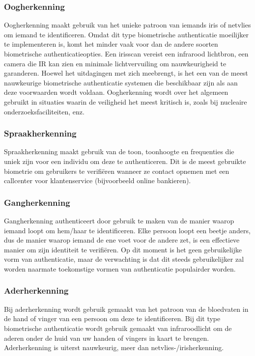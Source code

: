   \subsubsection{Oogherkenning}%
  \label{subsubsec:oogherkenning}
  Oogherkenning maakt gebruik van het unieke patroon van iemands iris of netvlies om iemand te identificeren. Omdat dit type biometrische authenticatie moeilijker te implementeren is, komt het minder vaak voor dan de andere soorten biometrische authenticatieopties. Een irisscan vereist een infrarood lichtbron, een camera die IR kan zien en minimale lichtvervuiling om nauwkeurigheid te garanderen. Hoewel het uitdagingen met zich meebrengt, is het een van de meest nauwkeurige biometrische authenticatie systemen die beschikbaar zijn als aan deze voorwaarden wordt voldaan. Oogherkenning wordt over het algemeen gebruikt in situaties waarin de veiligheid het meest kritisch is, zoals bij nucleaire onderzoeksfaciliteiten, enz.
  
  \subsubsection{Spraakherkenning}%
  \label{subsubsec:spraakherkenning}
  Spraakherkenning maakt gebruik van de toon, toonhoogte en frequenties die uniek zijn voor een individu om deze te authenticeren. Dit is de meest gebruikte biometrie om gebruikers te verifiëren wanneer ze contact opnemen met een callcenter voor klantenservice (bijvoorbeeld online bankieren).
  
  \subsubsection{Gangherkenning}%
  \label{subsubsec:gangherkenning}
  Gangherkenning authenticeert door gebruik te maken van de manier waarop iemand loopt om hem/haar te identificeren. Elke persoon loopt een beetje anders, dus de manier waarop iemand de ene voet voor de andere zet, is een effectieve manier om zijn identiteit te verifiëren. Op dit moment is het geen gebruikelijke vorm van authenticatie, maar de verwachting is dat dit steeds gebruikelijker zal worden naarmate toekomstige vormen van authenticatie populairder worden.
  
  \subsubsection{Aderherkenning}%
  \label{subsubsec:aderherkenning}
  Bij aderherkenning wordt gebruik gemaakt van het patroon van de bloedvaten in de hand of vinger van een persoon om deze te identificeren. Bij dit type biometrische authenticatie wordt gebruik gemaakt van infraroodlicht om de aderen onder de huid van uw handen of vingers in kaart te brengen. Aderherkenning is uiterst nauwkeurig, meer dan netvlies-/irisherkenning.
  
